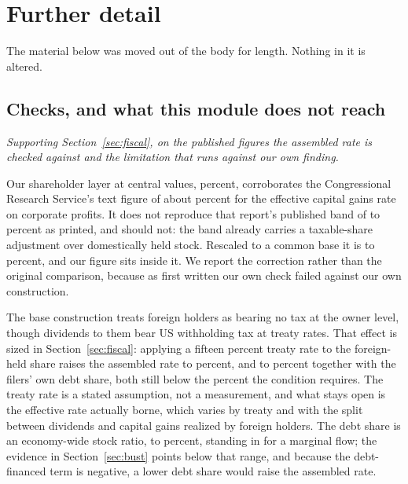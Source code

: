 \section{Further detail}
\label{app:detail}

The material below was moved out of the body for length. Nothing in it is altered.

\subsection{Checks, and what this module does not reach}

\emph{Supporting Section~\ref{sec:fiscal}, on the published figures the assembled rate is checked against and the limitation that runs against our own finding.}

Our shareholder layer at central values,  percent, corroborates the
Congressional Research Service's text figure of about  percent for the
effective capital gains rate on corporate profits. It does not reproduce that report's published
band of  to  percent as printed, and should not: the band
already carries a taxable-share adjustment over domestically held stock. Rescaled to a common base
it is  to  percent, and our figure sits inside it.
We report the correction rather than the original comparison, because as first written our own
check failed against our own construction.

The base construction treats foreign holders as bearing no tax at the owner level, though
dividends to them bear US withholding tax at treaty rates. That effect is sized in
Section~\ref{sec:fiscal}: applying a fifteen percent treaty rate to the foreign-held share raises
the assembled rate to  percent, and to  percent
together with the filers' own debt share, both still below the  percent
the condition requires. The treaty rate is a stated assumption, not a measurement, and what stays
open is the effective rate actually borne, which varies by treaty and with the split between
dividends and capital gains realized by foreign holders. The debt share is an economy-wide stock ratio,  to
 percent, standing in for a marginal flow; the evidence in
Section~\ref{sec:bust} points below that range, and because the debt-financed term is negative, a
lower debt share would raise the assembled rate.


